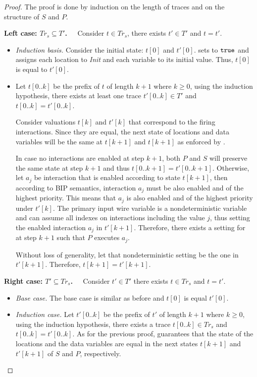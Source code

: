 \begin{proof}
\label{proof:equi-correct}
%
The proof is done by induction on the length of traces and 
on the structure of $S$ and $P$.

{\bf Left case: $Tr_s \subseteq T'$.~~}
Consider $t \in Tr_s$, there exists $t' \in T'$ and $t = t'$. 
\begin{itemize}
\item
\textit{Induction basis.}
Consider the initial state: $t[0]$ and $t'[0]$. 
 sets  to $\mathtt{true}$ and 
assigns each location to \textit{Init} and each variable 
to its initial value. Thus, $t[0]$ is equal to $t'[0]$. 
\item
Let $t[0..k]$ be the prefix of $t$ of length $k+1$ where 
$k\ge 0$, using the induction hypothesis, 
there exists at least one trace 
$t'[0..k] \in T'$ and $t[0..k]=t'[0..k]$. 

Consider valuations $t[k]$ and $t'[k]$ 
that correspond to the firing interactions.
Since they are equal, the next state of locations
and data variables will be the same at $t[k+1]$ and 
$t[k+1]$ as enforced by . 

In case no interactions are enabled at step $k+1$, 
both $P$ and $S$ will preserve the same state at step $k+1$ 
and thus $t[0..k+1] =t'[0..k+1]$. 
Otherwise, let $a_j$ be  interaction that is enabled 
according to state $t[k+1]$, 
then according to BIP semantics, interaction $a_j$ must be 
also enabled and of the highest priority. 
This means that $a_j$ is also enabled and of the highest 
priority under $t'[k]$. 
The primary input  wire variable is a 
nondeterministic variable and can assume all indexes on 
interactions including the value 
$j$, thus setting the enabled interaction $a_j$ in $t'[k+1]$. 
Therefore, there exists a setting for  at 
step $k+1$ such that $P$ executes $a_j$. 

Without loss of generality, 
let that nondeterministic setting be the one in $t'[k+1]$. 
Therefore, $t[k+1] = t'[k+1]$. 
\end{itemize}
%

{\bf Right case: $T' \subseteq Tr_s$.~~}
Consider $t' \in T'$ there exists $t \in Tr_s$ and $t = t'$.
%
\begin{itemize}
\item
\textit{Base case.}
The base case is similar as before and $t[0]$ is equal $t'[0]$.
\item
\textit{Induction case.}
Let $t'[0..k]$ be the prefix of $t'$ of length $k+1$ 
where $k\ge 0$, using the induction hypothesis, 
there exists a trace 
$t[0..k] \in Tr_s$ and $t[0..k]=t'[0..k]$. 
As for the previous proof,  
guarantees that the state of the locations and the data 
variables are equal in the next states $t[k+1]$ and 
$t'[k+1]$ of $S$ and $P$, respectively. 


\end{itemize}
\end{proof}
